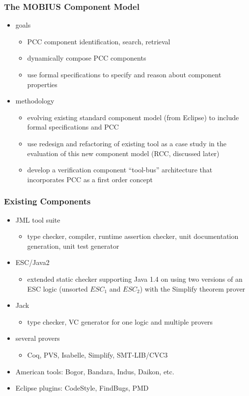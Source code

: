\documentclass{beamer}
\begin{document}
\begin{frame}\frametitle{The MOBIUS Component Model}
  \begin{itemize}
  \item goals
    \begin{itemize}
    \item PCC component identification, search, retrieval
    \item dynamically compose PCC components
    \item use formal specifications to specify and reason about
      component properties
    \end{itemize}
  \item methodology
    \begin{itemize}
    \item evolving existing standard component model (from Eclipse) to
      include formal specifications and PCC
    \item use redesign and refactoring of existing tool as a case study
      in the evaluation of this new component model (RCC, discussed
      later)
    \item develop a verification component ``tool-bus'' architecture that
      incorporates PCC as a first order concept
    \end{itemize}
  \end{itemize}
\end{frame}

\begin{frame}\frametitle{Existing Components}
  \begin{itemize}
  \item JML tool suite
    \begin{itemize}
    \item type checker, compiler, runtime assertion checker, unit
      documentation generation, unit test generator
    \end{itemize}
  \item ESC/Java2
    \begin{itemize}
    \item extended static checker supporting Java 1.4 on using two
      versions of an ESC logic (unsorted $ESC_1$ and $ESC_2$) with the Simplify
      theorem prover
    \end{itemize}
  \item Jack
    \begin{itemize}
    \item type checker, VC generator for one logic and multiple provers
    \end{itemize}
  \item several provers
    \begin{itemize}
    \item Coq, PVS, Isabelle, Simplify, SMT-LIB/CVC3
    \end{itemize}
  \item American tools: Bogor, Bandara, Indus, Daikon, etc.
  \item Eclipse plugins: CodeStyle, FindBugs, PMD
  \end{itemize}
\end{frame}
\end{document}
